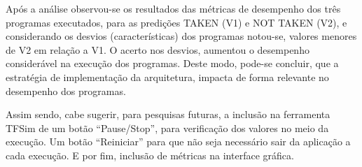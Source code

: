 \documentclass[12pt]{article}
\begin{document}
Após a análise observou-se os resultados das métricas de desempenho dos três programas executados, para as predições TAKEN (V1) e NOT TAKEN (V2), e considerando os desvios (características) dos programas notou-se, valores menores de V2 em relação a V1. O acerto nos desvios, aumentou o desempenho considerável na execução dos programas. Deste modo, pode-se concluir, que a estratégia de implementação da arquitetura, impacta de forma relevante no desempenho dos programas.

Assim sendo, cabe sugerir, para pesquisas futuras, a inclusão na ferramenta TFSim de um botão     ``Pause/Stop'', para verificação dos valores no meio da execução. Um botão ``Reiniciar'' para que não seja necessário sair da aplicação a cada execução. E por fim, inclusão de métricas na interface gráfica.



\end{document}
